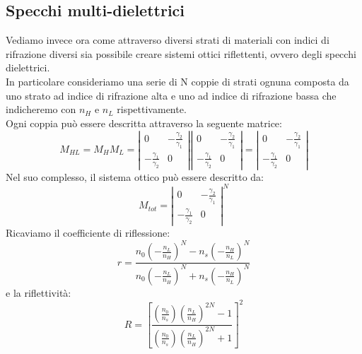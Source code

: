 \documentclass{article}
\begin{document}
\subsection{Specchi multi-dielettrici}
Vediamo invece ora come attraverso diversi strati di materiali con indici di rifrazione diversi sia possibile creare sistemi ottici riflettenti, ovvero degli specchi dielettrici.\\
In particolare consideriamo una serie di N coppie di strati ognuna composta da uno strato ad indice di rifrazione alta e uno ad indice di rifrazione bassa che indicheremo con $n_H$ e $n_L$ rispettivamente.\\
Ogni coppia può essere descritta attraverso la seguente matrice:
\begin{equation*}
M_{HL} = M_H M_L = \left| \begin{array}{cc}
0 & -\frac{\gamma_2}{\gamma_1} \\
-\frac{\gamma_1}{\gamma_2} & 0
\end{array} \right|
\left| \begin{array}{cc}
0 & -\frac{\gamma_2}{\gamma_1} \\
-\frac{\gamma_1}{\gamma_2} & 0
\end{array} \right|
= \left| \begin{array}{cc}
0 & -\frac{\gamma_2}{\gamma_1} \\
-\frac{\gamma_1}{\gamma_2} & 0
\end{array} \right|
\end{equation*}
Nel suo complesso, il sistema ottico può essere descritto da:
\begin{equation}
M_{tot} = \left| \begin{array}{cc}
0 & -\frac{\gamma_2}{\gamma_1} \\
-\frac{\gamma_1}{\gamma_2} & 0
\end{array} \right|^N
\end{equation}
Ricaviamo il coefficiente di riflessione:
\begin{equation*}
r = \frac{n_0(-\frac{n_L}{n_H})^N - n_s(-\frac{n_H}{n_L})^N}{n_0(-\frac{n_L}{n_H})^N + n_s(-\frac{n_H}{n_L})^N}
\end{equation*}
e la riflettività:
\begin{equation*}
R = \left[\frac{(\frac{n_0}{n_s})(\frac{n_L}{n_H})^{2N} - 1}{(\frac{n_0}{n_s})(\frac{n_L}{n_H})^{2N} + 1}\right]^2
\end{equation*}
\end{document}
